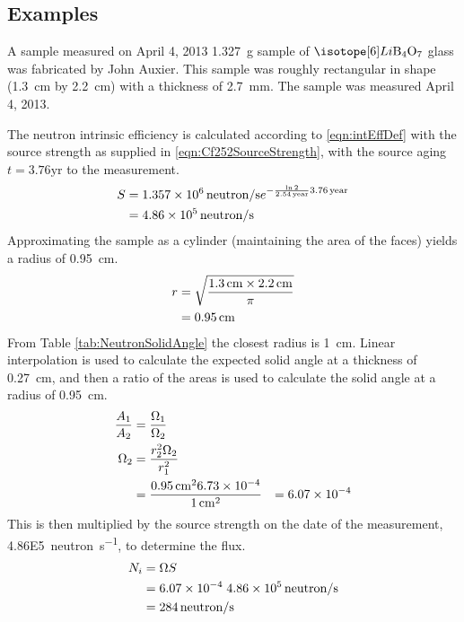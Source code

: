 \documentclass[draftcls,onecolumn]{IEEEtran}
\begin{document}
\pagebreak
\subsection{Examples}
\begin{Exercise*}[label={LiBorateGlass},title={Li borate glass},name={Example}]
A sample measured on April 4, 2013 \SI{1.327}{\g} sample of $\iso[6]{Li}\text{B}_4\text{O}_7$ glass was fabricated by John Auxier.
This sample was roughly rectangular in shape (\SI{1.3}{\cm} by \SI{2.2}{\cm}) with a thickness of \SI{2.7}{\mm}.
The sample was measured April 4, 2013.



The neutron intrinsic efficiency is calculated according to \eqref{eqn:intEffDef} with the source strength as supplied in \eqref{eqn:Cf252SourceStrength}, with the source aging $t = 3.76 \text{yr}$ to the measurement.
\begin{align}
    S &= \SI{1.357E6}{neutron\per\second} e^{-\frac{ \ln{2}}{\SI{2.54}{year}}\SI{3.76}{year}} \\ \notag
      &= \SI{4.86E5}{neutron\per\second}
\end{align}
Approximating the sample as a cylinder (maintaining the area of the faces) yields a radius of \SI{0.95}{\cm}.
\begin{align}
	r &= \sqrt{\frac{\SI{1.3}{\cm} \times \SI{2.2}{\cm}}{\pi}} \\ \notag
	& = \SI{0.95}{\cm}
\end{align}
From Table \ref{tab:NeutronSolidAngle} the closest radius is \SI{1}{\cm}.
Linear interpolation is used to calculate the expected solid angle at a thickness of \SI{0.27}{\cm}, and then a ratio of the areas is used to calculate the solid angle at a radius of \SI{0.95}{\cm}.
\begin{align*}
	\frac{A_1}{A_2} &= \frac{\Omega_1}{\Omega_2} \\ \notag
	\Omega_2 &= \frac{r_2^2 \Omega_2}{r_1^2} \\
	 &= \frac{\SI{0.95}{\cm}^2 \num{6.73E-4}}{\SI{1}{\cm}^2}
	 &= \num{6.07E-4}
\end{align*}
This is then multiplied by the source strength on the date of the measurement, \SI{4.86E5}{neutron\per\second}, to determine the flux.
\begin{align*}
 	N_i &= \Omega S \\
	 &= \num{6.07E-4} \; \SI{4.86E5}{neutron\per\second} \\
   &= \SI{284}{neutron\per\second}
\end{align*}


\end{Exercise*}
\end{document}
